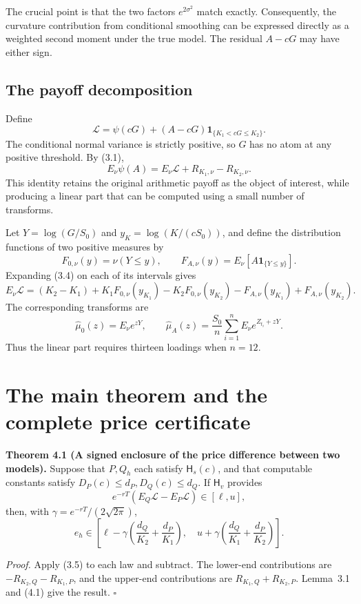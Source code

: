 The crucial point is that the two factors \(e^{2\sigma^2}\) match exactly. Consequently, the curvature contribution from conditional smoothing can be expressed directly as a weighted second moment under the true model. The residual \(A-cG\) may have either sign.

\subsection{The payoff decomposition}

Define
\[
\mathcal L=\psi(cG)+(A-cG)\mathbf1_{\{K_1<cG\le K_2\}}.
\tag{3.4}
\]
The conditional normal variance is strictly positive, so \(G\) has no atom at any positive threshold. By (3.1),
\[
E_\nu\psi(A)=E_\nu\mathcal L+R_{K_1,\nu}-R_{K_2,\nu}.
\tag{3.5}
\]
This identity retains the original arithmetic payoff as the object of interest, while producing a linear part that can be computed using a small number of transforms.

Let \(Y=\log(G/S_0)\) and \(y_K=\log(K/(cS_0))\), and define the distribution functions of two positive measures by
\[
F_{0,\nu}(y)=\nu(Y\le y),\qquad
F_{A,\nu}(y)=E_\nu[A\mathbf1_{\{Y\le y\}}].
\]
Expanding (3.4) on each of its intervals gives
\[
E_\nu\mathcal L=(K_2-K_1)
+K_1F_{0,\nu}(y_{K_1})-K_2F_{0,\nu}(y_{K_2})
-F_{A,\nu}(y_{K_1})+F_{A,\nu}(y_{K_2}).
\tag{3.6}
\]
The corresponding transforms are
\[
\widehat\mu_0(z)=E_\nu e^{zY},\qquad
\widehat\mu_A(z)=\frac{S_0}{n}\sum_{i=1}^n
E_\nu e^{Z_{t_i}+zY}.
\tag{3.7}
\]
Thus the linear part requires thirteen loadings when \(n=12\).

\section{The main theorem and the complete price certificate}

\textbf{Theorem 4.1 (A signed enclosure of the price difference between two models).}
Suppose that \(P,Q_h\) each satisfy \(\mathsf H_s(c)\), and that computable constants satisfy
\(D_P(c)\le d_P,D_Q(c)\le d_Q\). If \(\mathsf H_v\) provides
\[
e^{-rT}(E_Q\mathcal L-E_P\mathcal L)\in[\ell,u],
\tag{4.1}
\]
then, with \(\gamma=e^{-rT}/(2\sqrt{2\pi})\),
\[
\boxed{
e_h\in
\left[
\ell-\gamma\!\left(\frac{d_Q}{K_2}+\frac{d_P}{K_1}\right),
\quad
u+\gamma\!\left(\frac{d_Q}{K_1}+\frac{d_P}{K_2}\right)
\right].}
\tag{4.2}
\]

\textit{Proof.} Apply (3.5) to each law and subtract. The lower-end contributions are
\(-R_{K_2,Q}-R_{K_1,P}\), and the upper-end contributions are
\(R_{K_1,Q}+R_{K_2,P}\). Lemma~3.1 and (4.1) give the result. \hfill\(\square\)

